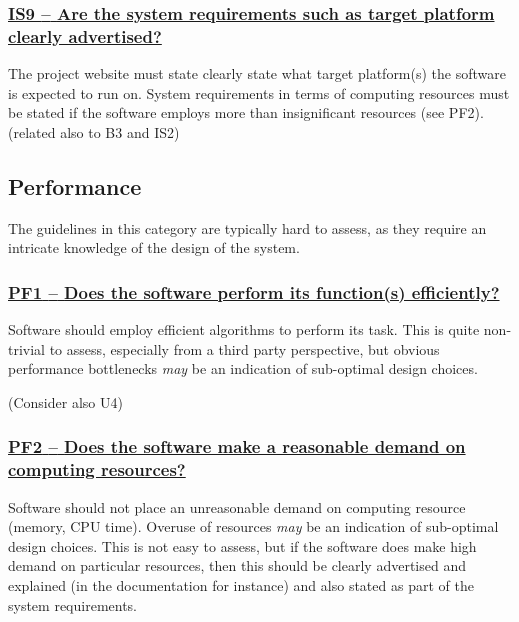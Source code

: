 \documentclass[a4paper,11pt]{article}
\newcommand{\criterion}[1]{\subsubsection*{\underline{#1}}}
\begin{document}
\newcommand{\isNineID}{IS9}
\newcommand{\isNineText}{Are the system requirements such as target platform clearly advertised?}
\criterion{\isNineID{ }--{ }\isNineText}\label{id:is9} 

The project website must state clearly state what target platform(s) the software is expected to run on.
System requirements in terms of computing resources must be stated if the software employs more than insignificant resources (see PF2).
(related also to B3 and IS2)

\subsection{Performance}\label{sec:per}

The guidelines in this category are typically hard to assess, as they require
an intricate knowledge of the design of the system. 

\newcommand{\pfOneID}{PF1}
\newcommand{\pfOneText}{Does the software perform its function(s) efficiently?}
\criterion{\pfOneID{ }--{ }\pfOneText}\label{id:pf1} 

Software should employ efficient algorithms to perform its task. This is quite
non-trivial to assess, especially from a third party perspective, but obvious
performance bottlenecks \emph{may} be an indication of sub-optimal design
choices.

%
%
%
(Consider also U4)

\newcommand{\pfTwoID}{PF2}
\newcommand{\pfTwoText}{Does the software make a reasonable demand on computing resources?}
\criterion{\pfTwoID{ }--{ }\pfTwoText}\label{id:pf2} 

Software should not place an unreasonable demand on computing resource (memory,
CPU time). Overuse of resources \emph{may} be an indication of sub-optimal
design choices.  This is not easy to assess, but if the software does make high
demand on particular resources, then this should be clearly advertised and
explained (in the documentation for instance) and also stated as part of the
system requirements.
\end{document}
